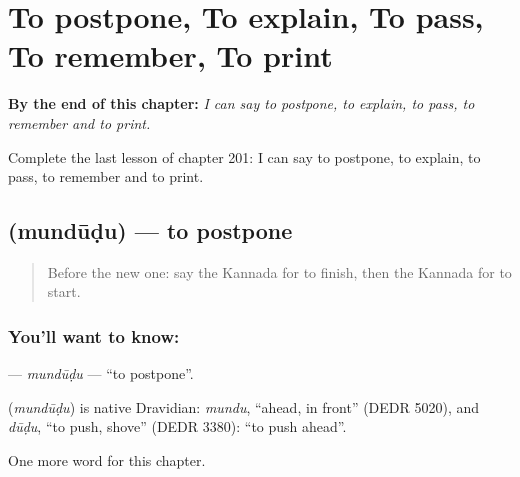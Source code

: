 
\chapter{To postpone, To explain, To pass, To remember, To print}
\label{ch:ka-to-postpone-to-explain-to-pass-to-remember-to-print}

\begin{chapteropening}
\textbf{By the end of this chapter:} \emph{I can say to postpone, to explain, to pass, to remember and to print.}

Complete the last lesson of chapter 201: I can say to postpone, to explain, to pass, to remember and to print.
\end{chapteropening}

\section[\texorpdfstring{\kn{ಮುಂದೂಡು} (mundūḍu)}{ಮುಂದೂಡು (mundūḍu)}]{ (mundūḍu) — to postpone}

\label{lesson:KA-C201-mundudu}



\begin{quote}
Before the new one: say the Kannada for to finish, then the Kannada for to start.
\end{quote}

\subsection*{You'll want to know: }
\textbf{} — \emph{mundūḍu} — \textquotedblleft{}to postpone\textquotedblright{}.

\begin{cousinweb}
\textbf{} (\emph{mundūḍu}) is native Dravidian: \emph{mundu}, \textquotedblleft{}ahead, in front\textquotedblright{} (DEDR 5020), and \emph{dūḍu}, \textquotedblleft{}to push, shove\textquotedblright{} (DEDR 3380): \textquotedblleft{}to push ahead\textquotedblright{}.
\end{cousinweb}

\begin{grammarlens}[title={What you've built}]
One more word for this chapter.
\end{grammarlens}

